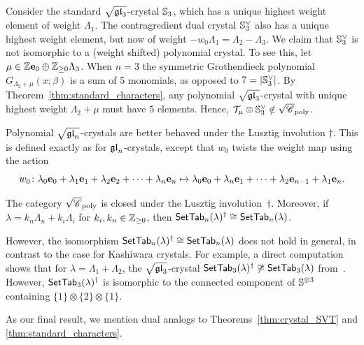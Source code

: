 \documentclass[11pt]{article}
\begin{document}
\begin{example}
\label{ex:dual_nonclosure}
Consider the standard $\sqrt{\mathfrak{gl}_3}$-crystal $\mathbb{S}_3$, which has a unique highest weight element of weight $\Lambda_1$.
The contragredient dual crystal $\mathbb{S}_3^{\vee}$ also has a unique highest weight element, but now of weight $-w_0 \Lambda_1 = \Lambda_2 - \Lambda_3$.
We claim that $\mathbb{S}_3^{\vee}$ is not isomorphic to a (weight shifted) polynomial crystal.
To see this, let $\mu \in \mathbb{Z} \textbf{e}_0 \oplus \mathbb{Z}_{\geq 0} \Lambda_3$.
When $n=3$ the symmetric Grothendieck polynomial $G_{\Lambda_2+\mu}(x; \beta)$ is a sum of 5 monomials, as opposed to $7 = \lvert \mathbb{S}_3^{\vee} \rvert$.
By Theorem~\ref{thm:standard_characters}, any polynomial $\sqrt{\mathfrak{gl}_3}$-crystal with unique highest weight $\Lambda_2 + \mu$ must have $5$ elements.
Hence,  $\mathcal{T}_{\mu} \otimes \mathbb{S}_3^{\vee} \notin \sqrt{\mathscr{C}}_{\operatorname{poly}}$.
\end{example}




Polynomial $\sqrt{\mathfrak{gl}_n}$-crystals are better behaved under the Lusztig involution $\dagger$.
This is defined exactly as for $\mathfrak{gl}_n$-crystals, except that $w_0$ twists the weight map using the action
\[
w_0 \colon\lambda_0 \textbf{e}_0 + \lambda_1\textbf{e}_1 + \lambda_2 \textbf{e}_2 + \dots +\lambda_n \textbf{e}_n 
\mapsto 
\lambda_0 \textbf{e}_0 + \lambda_n \textbf{e}_1 + \dots + \lambda_2 \textbf{e}_{n-1}+ \lambda_1\textbf{e}_n.
\]

\begin{proposition}
The category $\sqrt{\mathscr{C}}_{\operatorname{poly}}$ is closed under the Lusztig involution~$\dagger$.
Moreover, if $\lambda=k_n \Lambda_n + k_i \Lambda_i$ for $k_i, k_n\in \mathbb{Z}_{\geq 0}$, then $\mathsf{SetTab}_n(\lambda)^{\dagger} \cong \mathsf{SetTab}_n(\lambda)$.
\end{proposition}

However, the isomorphism $\mathsf{SetTab}_n(\lambda)^{\dagger} \cong \mathsf{SetTab}_n(\lambda)$ does not hold in general, in contrast to the case for Kashiwara crystals.
For example, a direct computation shows that for $\lambda = \Lambda_1+\Lambda_2$, the $\sqrt{\mathfrak{gl}_3}$-crystal $\mathsf{SetTab}_3(\lambda)^{\dagger} \not\cong \mathsf{SetTab}_3(\lambda)$ from~\cite[Fig.~4.1]{Yu23}.
However, $\mathsf{SetTab}_3(\lambda)^{\dagger}$ is isomorphic to the connected component of $\mathbb{S}^{\otimes 3}$ containing $\{1\} \otimes \{2\} \otimes \{1\}$.

As our final result, we mention dual analogs to Theorems~\ref{thm:crystal_SVT} and \ref{thm:standard_characters}.
\end{document}
